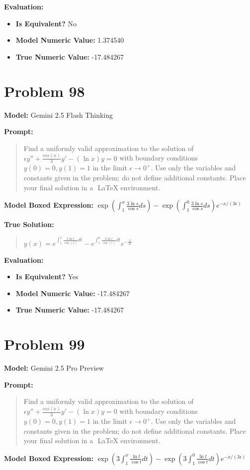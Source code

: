 \documentclass{article}
\begin{document}
{\textbf{Evaluation:}
\begin{itemize}
\item \textbf{Is Equivalent?} No
\item \textbf{Model Numeric Value:} 1.374540
\item \textbf{True Numeric Value:} -17.484267
\end{itemize}
\vspace{1cm}
\section*{Problem 98}
\textbf{Model:} Gemini 2.5 Flash Thinking

\textbf{Prompt:}
\begin{quote}
Find a uniformly valid approximation to the solution of $\epsilon y'' + \frac{cos(x)}{3}y' - (\ln x)y = 0$ with boundary conditions $y(0) = 0, y(1) = 1$ in the limit $\epsilon \to 0^+$. Use only the variables and constants given in the problem; do not define additional constants. Place your final solution in a $\boxed{}$ LaTeX environment.
\end{quote}
\textbf{Model Boxed Expression:} $\exp\left(\int_1^x \frac{3 \ln s}{\cos s} ds\right) - \exp\left(\int_1^0 \frac{3 \ln s}{\cos s} ds\right) e^{-x/(3\epsilon)}$

\textbf{True Solution:}
\begin{quote}
$y(x) = e^{\int_{1}^{x}\frac{3\ln t}{\cos(t)}dt} - e^{\int_{1}^{0}\frac{3\ln t}{\cos(t)}dt}e^{- \frac{x}{3\epsilon}}$
\end{quote}

\textbf{Evaluation:}
\begin{itemize}
\item \textbf{Is Equivalent?} Yes
\item \textbf{Model Numeric Value:} -17.484267
\item \textbf{True Numeric Value:} -17.484267
\end{itemize}
\vspace{1cm}
\section*{Problem 99}
\textbf{Model:} Gemini 2.5 Pro Preview

\textbf{Prompt:}
\begin{quote}
Find a uniformly valid approximation to the solution of $\epsilon y'' + \frac{cos(x)}{3}y' - (\ln x)y = 0$ with boundary conditions $y(0) = 0, y(1) = 1$ in the limit $\epsilon \to 0^+$. Use only the variables and constants given in the problem; do not define additional constants. Place your final solution in a $\boxed{}$ LaTeX environment.
\end{quote}
\textbf{Model Boxed Expression:} $\exp\left(3 \int_1^x \frac{\ln t}{\cos t} dt\right) - \exp\left(3 \int_1^0 \frac{\ln t}{\cos t} dt\right) e^{-x/(3\epsilon)}$

}
\end{document}

